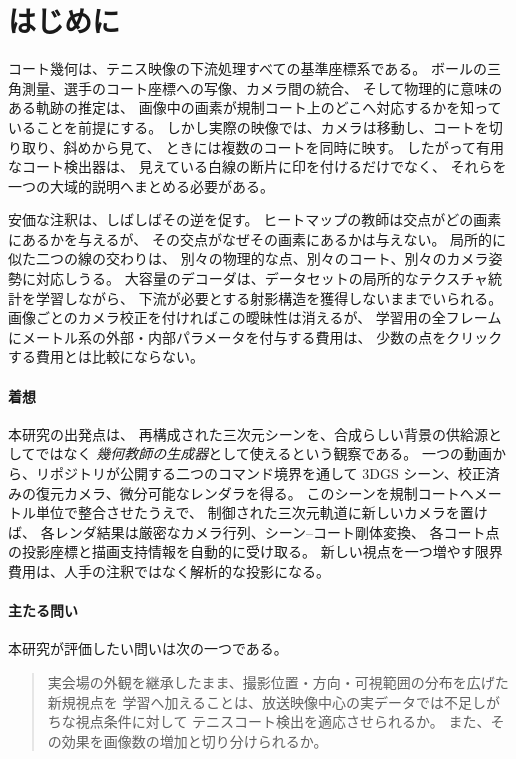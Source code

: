 \section{はじめに}
\label{sec:introduction}

コート幾何は、テニス映像の下流処理すべての基準座標系である。
ボールの三角測量、選手のコート座標への写像、カメラ間の統合、
そして物理的に意味のある軌跡の推定は、
画像中の画素が規制コート上のどこへ対応するかを知っていることを前提にする。
しかし実際の映像では、カメラは移動し、コートを切り取り、斜めから見て、
ときには複数のコートを同時に映す。
したがって有用なコート検出器は、
見えている白線の断片に印を付けるだけでなく、
それらを一つの大域的説明へまとめる必要がある。

安価な注釈は、しばしばその逆を促す。
ヒートマップの教師は交点がどの画素にあるかを与えるが、
その交点がなぜその画素にあるかは与えない。
局所的に似た二つの線の交わりは、
別々の物理的な点、別々のコート、別々のカメラ姿勢に対応しうる。
大容量のデコーダは、データセットの局所的なテクスチャ統計を学習しながら、
下流が必要とする射影構造を獲得しないままでいられる。
画像ごとのカメラ校正を付ければこの曖昧性は消えるが、
学習用の全フレームにメートル系の外部・内部パラメータを付与する費用は、
少数の点をクリックする費用とは比較にならない。

\paragraph{着想}
本研究の出発点は、
再構成された三次元シーンを、合成らしい背景の供給源としてではなく
\emph{幾何教師の生成器}として使えるという観察である。
一つの動画から、リポジトリが公開する二つのコマンド境界を通して
3DGS シーン、校正済みの復元カメラ、微分可能なレンダラを得る\cite{kerbl2023gaussian}。
このシーンを規制コートへメートル単位で整合させたうえで、
制御された三次元軌道に新しいカメラを置けば、
各レンダ結果は厳密なカメラ行列、シーン--コート剛体変換、
各コート点の投影座標と描画支持情報を自動的に受け取る。
新しい視点を一つ増やす限界費用は、人手の注釈ではなく解析的な投影になる。

\paragraph{主たる問い}
本研究が評価したい問いは次の一つである。

\begin{quote}
実会場の外観を継承したまま、撮影位置・方向・可視範囲の分布を広げた新規視点を
学習へ加えることは、放送映像中心の実データでは不足しがちな視点条件に対して
テニスコート検出を適応させられるか。
また、その効果を画像数の増加と切り分けられるか。
\end{quote}

